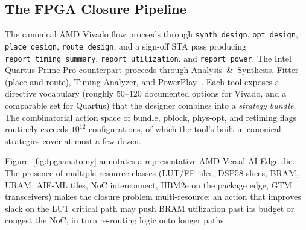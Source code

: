 \documentclass[journal]{IEEEtran}
\begin{document}
\subsection{The FPGA Closure Pipeline}
The canonical AMD Vivado flow proceeds through \texttt{synth\_design}, \texttt{opt\_design}, \texttt{place\_design}, \texttt{route\_design}, and a sign-off STA pass producing \texttt{report\_timing\_summary}, \texttt{report\_utilization}, and \texttt{report\_power}. The Intel Quartus Prime Pro counterpart proceeds through Analysis~\&~Synthesis, Fitter (place and route), Timing Analyzer, and PowerPlay~\cite{intel_ug20156}. Each tool exposes a directive vocabulary (roughly $50$--$120$ documented options for Vivado, and a comparable set for Quartus) that the designer combines into a \emph{strategy bundle}. The combinatorial action space of bundle, pblock, phys-opt, and retiming flags routinely exceeds $10^{12}$ configurations, of which the tool's built-in canonical strategies cover at most a few dozen.

Figure~\ref{fig:fpgaanatomy} annotates a representative AMD Versal AI Edge die. The presence of multiple resource classes (LUT/FF tiles, DSP58 slices, BRAM, URAM, AIE-ML tiles, NoC interconnect, HBM2e on the package edge, GTM transceivers) makes the closure problem multi-resource: an action that improves slack on the LUT critical path may push BRAM utilization past its budget or congest the NoC, in turn re-routing logic onto longer paths.
\end{document}
